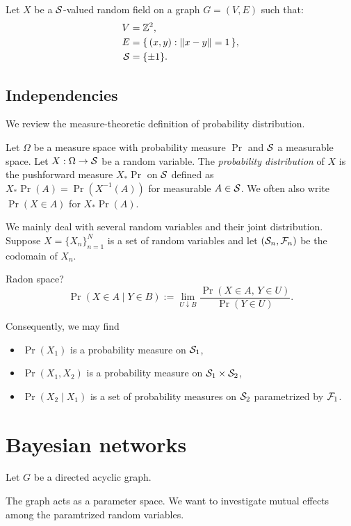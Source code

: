 \documentclass{../exp}
\begin{document}
\begin{ex}
Let $X$ be a $\mathcal{S}$-valued random field on a graph $G=(V,E)$ such that:
\begin{align*}
V&=\mathbb{Z}^2,\\
E&=\{\,(x,y):\|x-y\|=1\,\},\\
\mathcal{S}&=\{\pm1\}.
\end{align*}
\end{ex}


\subsection{Independencies}

We review the measure-theoretic definition of probability distribution.
\begin{defn}
Let $\Omega$ be a measure space with probability measure $\Pr$ and $\mathcal{S}$ a measurable space.
Let $X:\Omega\to\cS$ be a random variable.
The \emph{probability distribution} of $X$ is the pushforward measure $X_*\Pr$ on $\mathcal{S}$ defined as $X_*\Pr(A)=\Pr(X^{-1}(A))$ for measurable $A\in\mathcal{S}$.
We often also write $\Pr(X\in A)$ for $X_*\Pr(A)$.
\end{defn}

We mainly deal with several random variables and their joint distribution.
Suppose $X=\{X_n\}_{n=1}^N$ is a set of random variables and let $(\mathcal{S}_n,\mathcal{F}_n)$ be the codomain of $X_n$.
\begin{defn}
Radon space?
\[\Pr(X\in A\mid Y\in B):=\lim_{U\downarrow B}\frac{\Pr(X\in A,\,Y\in U)}{\Pr(Y\in U)}.\]
\end{defn}


Consequently, we may find
\begin{itemize}
\item $\Pr(X_1)$ is a probability measure on $\mathcal{S}_1$,
\item $\Pr(X_1,X_2)$ is a probability measure on $\mathcal{S}_1\times\mathcal{S}_2$,
\item $\Pr(X_2\mid X_1)$ is a set of probability measures on $\mathcal{S}_2$ parametrized by $\mathcal{F}_1$.
\end{itemize}




\section{Bayesian networks}


\begin{defn}
Let $G$ be a directed acyclic graph.
\end{defn}
The graph acts as a parameter space.
We want to investigate mutual effects among the paramtrized random variables.
\begin{thm}

\end{thm}
\end{document}
